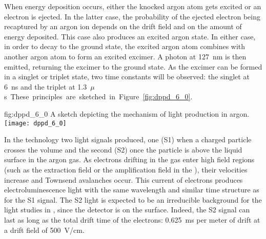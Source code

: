 When energy deposition occurs, either the knocked argon atom gets excited or an electron is ejected. In the latter case, the probability of the ejected electron being recaptured by an argon ion depends on the drift field and on the amount of energy deposited. This case also produces an excited argon state. In either case, in order to decay to the ground state, the excited argon atom combines with another argon atom to form an excited excimer. A photon at \SI{127}{nm} is then emitted, returning  the excimer to the ground state. As the excimer can be formed in a singlet or triplet state, two time constants will be observed: the singlet at \SI{6}{ns}
and the triplet at \SI{1.3}{$\mu$s}. These principles are sketched in Figure~\ref{fig:dppd_6_0}.

\begin{dunefigure}{fig:dppd_6_0}
{A sketch depicting the mechanism of light production in argon.}
\texttt{[image: dppd\_6\_0]}
\end{dunefigure}

In the \dual technology two light signals produced, one (S1) when a charged particle crosses the \lar volume and the second (S2) once the particle is above the liquid surface in the argon gas. 
As electrons drifting in the gas enter high field regions (such as the extraction field or the amplification field in the ), their velocities increase and Townsend avalanches occur. This current of electrons produces electroluminescence light with the same wavelength and similar time structure as for the S1 signal. 
The S2 light is expected to be an irreducible background for the light studies in , since the detector is on the surface. Indeed, the S2 signal can last as long as the total drift time of the electrons: \SI{0.625}{ms} per meter of drift at a drift field of \SI{500}{V/cm}.

